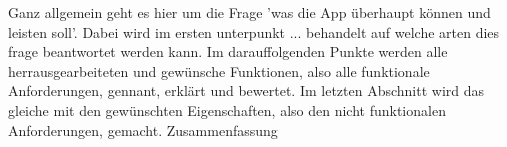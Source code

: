Ganz allgemein geht es hier um die Frage 'was die App überhaupt können und leisten soll'. \newline
Dabei wird im ersten unterpunkt ... behandelt auf welche arten dies frage beantwortet werden kann.
Im darauffolgenden Punkte werden alle herrausgearbeiteten und gewünsche Funktionen, also alle funktionale Anforderungen, gennant, erklärt und bewertet.
Im letzten Abschnitt wird das gleiche mit den gewünschten Eigenschaften, also den nicht funktionalen Anforderungen, gemacht. \newline
\myTodo Zusammenfassung